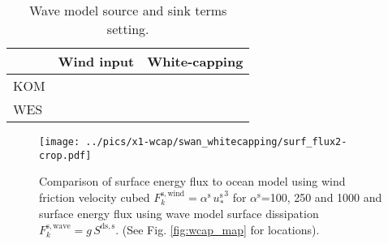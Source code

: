 \documentclass[final]{svjour3}
\begin{document}
\begin{table}
 \begin{center}
   \caption{Wave model source and sink terms setting.}
   \label{tab:wcap_methods}
   \begin{tabular}{l c c}
    \hline
          &     Wind input       &  White-capping  \\
         \hline KOM    &   \cite{snyder1981array}  &  
         \cite{komen1984existence}
         \\
                WES \citep{mulligan2008whitecapping}  &   \cite{yan1987improved}    
                &\cite{alves2003performance} \\\hline
   \end{tabular}
 \end{center}
\end{table}

\begin{figure}
   \centering
   \texttt{[image: ../pics/x1-wcap/swan\_whitecapping/surf\_flux2-crop.pdf]} 
   \caption{Comparison of surface energy flux to ocean model using wind friction
   velocity cubed $F_k^\mathrm{s,wind}=\alpha^\mathrm{s} \, {u_*^\mathrm{s}}^3$ 
   for $\alpha^\mathrm{s}$=100, 250 and 1000 and surface energy flux using wave
   model surface dissipation  $F_k^\mathrm{s,wave}=g \, S^{\mathrm{ds,s}}$. (See
   Fig. \ref{fig:wcap_map} for locations).}
   \label{fig:surface_flux_compare}
\end{figure}

\end{document}

